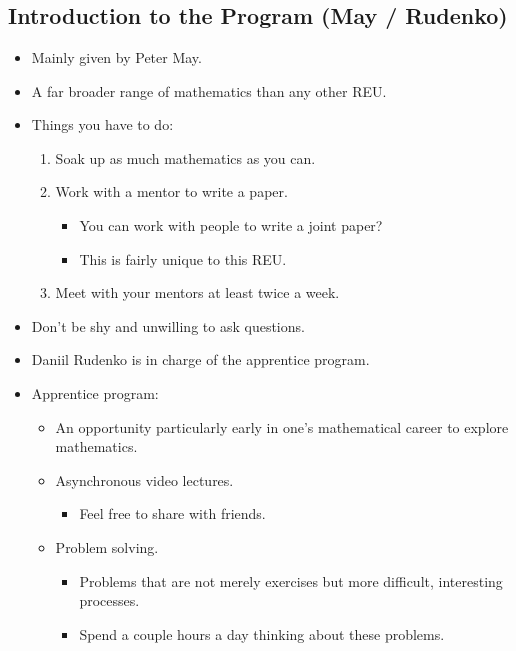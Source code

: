 \documentclass[../main.tex]{subfiles}
\begin{document}
\chapter{}
\section{Introduction to the Program (May / Rudenko)}
\begin{itemize}
    \item {}Mainly given by Peter May.
    \item A far broader range of mathematics than any other REU.
    \item Things you have to do:
    \begin{enumerate}
        \item Soak up as much mathematics as you can.
        \item Work with a mentor to write a paper.
        \begin{itemize}
            \item You can work with people to write a joint paper?
            \item This is fairly unique to this REU.
        \end{itemize}
        \item Meet with your mentors at least twice a week.
    \end{enumerate}
    \item Don't be shy and unwilling to ask questions.
    \item Daniil Rudenko is in charge of the apprentice program.
    \item Apprentice program:
    \begin{itemize}
        \item An opportunity particularly early in one's mathematical career to explore mathematics.
        \item Asynchronous video lectures.
        \begin{itemize}
            \item Feel free to share with friends.
        \end{itemize}
        \item Problem solving.
        \begin{itemize}
            \item Problems that are not merely exercises but more difficult, interesting processes.
            \item Spend a couple hours a day thinking about these problems.

\end{itemize}
\end{itemize}
\end{itemize}
\end{document}

